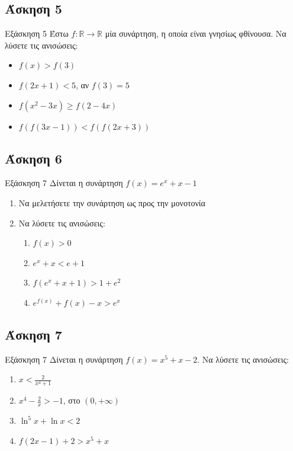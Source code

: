 \documentclass[greek]{beamer}
\begin{document}
\subsection{Άσκηση 5}
\begin{frame}[label=Άσκηση5,t]{Εξάσκηση 5}
      Έστω $f:\mathbb{R}\to\mathbb{R}$ μία συνάρτηση, η οποία είναι γνησίως φθίνουσα. Να λύσετε τις ανισώσεις:
      \begin{itemize}
            \item $f(x)>f(3)$
            \item $f(2x+1)<5$, αν $f(3)=5$
            \item $f(x^2-3x)\ge f(2-4x)$
            \item $f\left(f(3x-1)\right)<f\left(f(2x+3)\right)$
      \end{itemize}
\end{frame}

\subsection{Άσκηση 6}
\begin{frame}[label=Άσκηση6,t]{Εξάσκηση 7}
      Δίνεται η συνάρτηση $f(x)=e^x+x-1$
      \begin{enumerate}
            \item Να μελετήσετε την συνάρτηση ως προς την μονοτονία \pause
            \item Να λύσετε τις ανισώσεις:
                  \begin{enumerate}
                        \item $f(x)>0$ \pause
                        \item $e^x+x<e+1$ \pause
                        \item $f(e^x+x+1)>1+e^2$ \pause
                        \item $e^{f(x)}+f(x)-x>e^x$
                  \end{enumerate}
      \end{enumerate}
\end{frame}

\subsection{Άσκηση 7}
\begin{frame}[label=Άσκηση7,t]{Εξάσκηση 7}
      Δίνεται η συνάρτηση $f(x)=x^5+x-2$. Να λύσετε τις ανισώσεις:
      \begin{enumerate}
            \item $x<\frac{2}{x^4+1}$ \pause
            \item $x^4-\frac{2}{x}>-1$, στο $(0,+\infty)$ \pause
            \item $\ln^5 x+\ln x<2$ \pause
            \item $f(2x-1)+2>x^5+x$
      \end{enumerate}
\end{frame}
\end{document}
